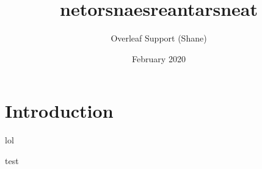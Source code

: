 \documentclass{article}
\title{netorsnaesreantarsneat}
\author{Overleaf Support (Shane)}
\date{February 2020}
\begin{document}
\maketitle

\section{Introduction}
lol


test
\end{document}
